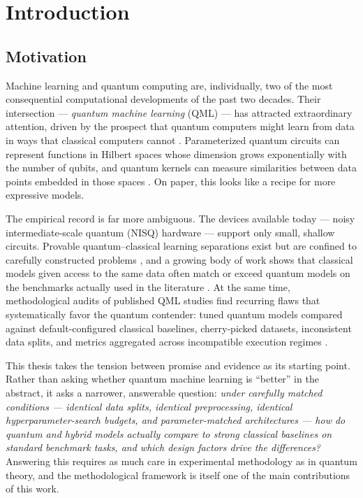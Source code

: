 \chapter{Introduction}
\label{ch:introduction}

\section{Motivation}
\label{sec:intro-motivation}

Machine learning and quantum computing are, individually, two of the most
consequential computational developments of the past two decades. Their
intersection --- \emph{quantum machine learning} (QML) --- has attracted
extraordinary attention, driven by the prospect that quantum computers might
learn from data in ways that classical computers cannot
\citep{biamonte2017qml, schuld2021book}. Parameterized quantum circuits can
represent functions in Hilbert spaces whose dimension grows exponentially with
the number of qubits, and quantum kernels can measure similarities between data
points embedded in those spaces \citep{havlicek2019kernels, schuld2019hilbert}.
On paper, this looks like a recipe for more expressive models.

The empirical record is far more ambiguous. The devices available today ---
noisy intermediate-scale quantum (NISQ) hardware \citep{preskill2018nisq} ---
support only small, shallow circuits. Provable quantum--classical learning
separations exist but are confined to carefully constructed problems
\citep{liu2021rigorous}, and a growing body of work shows that classical models
given access to the same data often match or exceed quantum models on the
benchmarks actually used in the literature \citep{huang2021power,
bowles2024better, schnabel2025scrutiny}. At the same time, methodological
audits of published QML studies find recurring flaws that systematically favor
the quantum contender: tuned quantum models compared against default-configured
classical baselines, cherry-picked datasets, inconsistent data splits, and
metrics aggregated across incompatible execution regimes
\citep{bowles2024better}.

This thesis takes the tension between promise and evidence as its starting
point. Rather than asking whether quantum machine learning is ``better'' in the
abstract, it asks a narrower, answerable question: \emph{under carefully matched
conditions --- identical data splits, identical preprocessing, identical
hyperparameter-search budgets, and parameter-matched architectures --- how do
quantum and hybrid models actually compare to strong classical baselines on
standard benchmark tasks, and which design factors drive the differences?}
Answering this requires as much care in experimental methodology as in quantum
theory, and the methodological framework is itself one of the main
contributions of this work.


